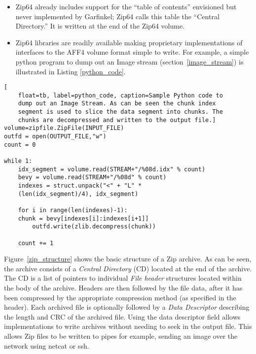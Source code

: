 \documentclass[10pt, conference]{IEEEtran}
\begin{document}
{{\begin{itemize}
\item Zip64 already includes support for the ``table of contents''
  envisioned but never implemented by Garfinkel; Zip64 calls this
  table the ``Central Directory.'' It is written at the end of the
  Zip64 volume.

\item Zip64 libraries are readily available making proprietary implementations of
  interfaces to the AFF4 volume format simple to write. For example, a
  simple python program to dump out an Image stream
  (section~\ref{image_stream}) is illustrated in Listing
  \ref{python_code}.

\end{itemize}

\begin{lstlisting}[
	float=tb, label=python_code, caption=Sample Python code to
	dump out an Image Stream. As can be seen the chunk index
	segment is used to slice the data segment into chunks. The
	chunks are decompressed and written to the output file.]
volume=zipfile.ZipFile(INPUT_FILE)
outfd = open(OUTPUT_FILE,"w")
count = 0

while 1:
    idx_segment = volume.read(STREAM+"/%08d.idx" % count)
    bevy = volume.read(STREAM+"/%08d" % count)
    indexes = struct.unpack("<" + "L" * 
	(len(idx_segment)/4), idx_segment)

    for i in range(len(indexes)-1):
	chunk = bevy[indexes[i]:indexes[i+1]]
        outfd.write(zlib.decompress(chunk))

    count += 1
\end{lstlisting}

Figure~\ref{zip_structure} shows the basic structure of a Zip
archive. As can be seen, the archive consists of a {\em Central Directory} (CD)
located at the end of the archive. The CD is a list of pointers to
individual {\em File header} structures located within the body of the
archive. Headers are then followed by the file data, after it has been
compressed by the appropriate compression method (as specified in the
header). Each archived file is optionally followed by a {\em Data
Descriptor} describing the length and CRC of the archived file. Using
the data descriptor field allows implementations to write archives
without needing to seek in the output file. This allows Zip files to
be written to pipes for example, sending an image over the network
using netcat or ssh.

\begin{figure}[tbp]
  \begin{center}
  \mbox{\columnwidth {}}


\end{center}
\end{figure}}}
\end{document}
